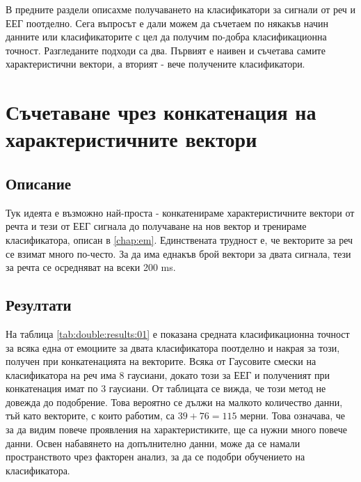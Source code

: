 \documentclass[main.tex]{subfiles}
\begin{document}
В предните раздели описахме получаването на класификатори за сигнали от реч и ЕЕГ поотделно. Сега въпросът е дали можем да съчетаем по някакъв начин данните или класификаторите с цел да получим по-добра класификационна точност. Разгледаните подходи са два. Първият е наивен и съчетава самите характеристични вектори, а вторият - вече получените класификатори.

\section{Съчетаване чрез конкатенация на характеристичните вектори}
\subsection{Описание}
Тук идеята е възможно най-проста - конкатенираме характеристичните вектори от речта и тези от ЕЕГ сигнала до получаване на нов вектор и тренираме класификатора, описан в \autoref{chap:em}. Единствената трудност е, че векторите за реч се взимат много по-често. За да има еднакъв брой вектори за двата сигнала, тези за речта се осредняват на всеки 200 ms.
\subsection{Резултати}
На таблица \autoref{tab:double:results:01} е показана средната класификационна точност за всяка една от емоциите за двата класификатора поотделно и накрая за този, получен при конкатенацията на векторите. Всяка от Гаусовите смески на класификатора на реч има 8 гаусиани, докато този за ЕЕГ и полученият при конкатенация имат по 3 гаусиани. От таблицата се вижда, че този метод не довежда до подобрение. Това вероятно се дължи на малкото количество данни, тъй като векторите, с които работим, са $39 + 76 = 115$ мерни. Това означава, че за да видим повече проявления на характеристиките, ще са нужни много повече данни. Освен набавянето на допълнително данни, може да се намали пространството чрез факторен анализ, за да се подобри обучението на класификатора.
\end{document}
